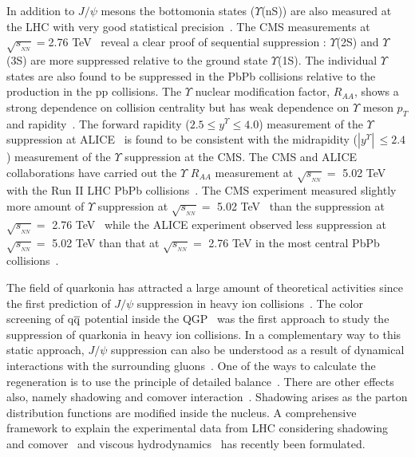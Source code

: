 \documentclass[12pt,a4paper,final]{iopart} %
\newcommand{\Jpsi}{J/\psi}
\newcommand{\pT}{p_{T}}
\newcommand{\sNN}{\sqrt{s_{_{NN}}}}
\begin{document}
In addition to $\Jpsi$ mesons the bottomonia states ($\Upsilon$(nS)) are also measured at
the LHC with very good statistical
precision~\cite{Chatrchyan:2011pe,Chatrchyan:2012lxa,Abelev:2014nua,Khachatryan:2016xxp}.
The CMS measurements at $\sNN =$2.76 TeV~\cite{Chatrchyan:2011pe,Chatrchyan:2012lxa} reveal
a clear proof of sequential suppression :  $\Upsilon$(2S) and $\Upsilon$(3S) are 
more suppressed relative to the ground state $\Upsilon$(1S).   The individual $\Upsilon$ states are also found to be suppressed in
the PbPb collisions relative to the production in the pp collisions. The $\Upsilon$ nuclear
modification factor, $R_{AA}$, shows a strong dependence on collision centrality but has
weak dependence on $\Upsilon$ meson $\pT$ and rapidity~\cite{Khachatryan:2016xxp}.
The forward rapidity ($2.5 \leq y^{\Upsilon} \leq 4.0$) measurement of the $\Upsilon$ suppression at 
ALICE~\cite{Abelev:2014nua} is found to be consistent with the midrapidity ($|y^{\Upsilon}|\,\leq 2.4$)
measurement of the $\Upsilon$ suppression at the CMS. 
The CMS and ALICE collaborations have carried out the $\Upsilon\,\, R_{AA}$ measurement
at $\sNN =$ 5.02 TeV with the Run II LHC PbPb
collisions~\cite{Sirunyan:2017lzi,CMS:2017ucd,ALICE:Y5TeV}.
The CMS experiment measured slightly more amount of $\Upsilon$ suppression at
$\sNN =$ 5.02 TeV~\cite{Sirunyan:2017lzi,CMS:2017ucd} than the suppression at
$\sNN =$ 2.76 TeV~\cite{Khachatryan:2016xxp} while the ALICE experiment observed less
suppression at $\sNN =$ 5.02 TeV than that at $\sNN =$ 2.76 TeV 
in the most central PbPb collisions~\cite{Abelev:2014nua,ALICE:Y5TeV}. 

 The field of quarkonia has attracted a large amount of theoretical activities
since the first prediction of $\Jpsi$ suppression in heavy 
ion collisions~\cite{Matsui:1986dk,Hashimoto:1986nn}. 
The color screening
of q$\overline{\rm q}$ potential inside the QGP~\cite{Karsch:1987pv,Abdulsalam:2012bw}
was the first approach to study the suppression of quarkonia
in heavy ion collisions. 
 In a complementary way to this static approach, $\Jpsi$ suppression can also be understood
as a result of dynamical interactions with the surrounding gluons~\cite{Bhanot:1979vb,Chen:2017jje,Kumar:2014kfa}.
One of the ways to calculate the regeneration is to use the principle of detailed balance~\cite{Thews:2000rj}.  
There are other effects also, namely shadowing and comover interaction~\cite{Vogt:2015uba,Ferreiro:2014bia}.
Shadowing arises as the parton distribution functions are modified inside the nucleus. 
A comprehensive framework to explain the experimental data from LHC considering shadowing and 
comover~\cite{Du:2017qkv,Rapp:2017chc} and viscous hydrodynamics~\cite{Krouppa:2015yoa,Krouppa:2017jlg}
has recently been formulated. 
\end{document}
